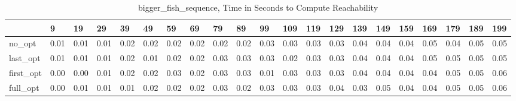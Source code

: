 \begin{table}
\caption{bigger_fish_sequence, Time in Seconds to Compute Reachability}
\label{bigger_fish_sequence_states_time}
\begin{tabular}{lllllllllllllllllllll}
\toprule
 & 9 & 19 & 29 & 39 & 49 & 59 & 69 & 79 & 89 & 99 & 109 & 119 & 129 & 139 & 149 & 159 & 169 & 179 & 189 & 199 \\
\midrule
no_opt & 0.01 & 0.01 & 0.01 & 0.02 & 0.02 & 0.02 & 0.02 & 0.02 & 0.02 & 0.03 & 0.03 & 0.03 & 0.03 & 0.04 & 0.04 & 0.04 & 0.05 & 0.04 & 0.05 & 0.05 \\
last_opt & 0.01 & 0.01 & 0.01 & 0.02 & 0.01 & 0.02 & 0.02 & 0.03 & 0.03 & 0.03 & 0.02 & 0.03 & 0.03 & 0.04 & 0.04 & 0.04 & 0.05 & 0.05 & 0.05 & 0.05 \\
first_opt & 0.00 & 0.00 & 0.01 & 0.02 & 0.02 & 0.03 & 0.02 & 0.03 & 0.03 & 0.01 & 0.03 & 0.03 & 0.03 & 0.04 & 0.04 & 0.04 & 0.04 & 0.05 & 0.05 & 0.06 \\
full_opt & 0.00 & 0.01 & 0.01 & 0.01 & 0.02 & 0.02 & 0.02 & 0.03 & 0.02 & 0.03 & 0.03 & 0.03 & 0.04 & 0.03 & 0.05 & 0.04 & 0.04 & 0.05 & 0.05 & 0.06 \\
\bottomrule
\end{tabular}
\end{table}
